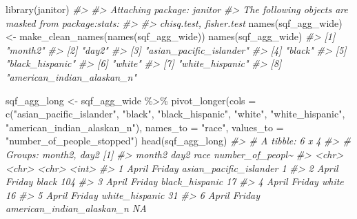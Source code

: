 \documentclass[
]{krantz}
\makeatletter
\newenvironment{Shaded}{\begin{snugshade}}{\end{snugshade}}
\newcommand{\AttributeTok}[1]{\textcolor[rgb]{0.61,0.61,0.61}{#1}}
\newcommand{\CommentTok}[1]{\textcolor[rgb]{0.37,0.37,0.37}{\textit{#1}}}
\newcommand{\FunctionTok}[1]{\textcolor[rgb]{0,0,0}{#1}}
\newcommand{\NormalTok}[1]{#1}
\newcommand{\OtherTok}[1]{\textcolor[rgb]{0.37,0.37,0.37}{#1}}
\newcommand{\SpecialCharTok}[1]{\textcolor[rgb]{0,0,0}{#1}}
\newcommand{\StringTok}[1]{\textcolor[rgb]{0.5,0.5,0.5}{#1}}
\newenvironment{kframe}{%
\medskip{}
\setlength{\fboxsep}{.8em}
 \def\at@end@of@kframe{}%
 \ifinner\ifhmode%
  \def\at@end@of@kframe{\end{minipage}}%
  \begin{minipage}{\columnwidth}%
 \fi\fi%
 \def\FrameCommand##1{\hskip\@totalleftmargin \hskip-\fboxsep
 \colorbox{shadecolor}{##1}\hskip-\fboxsep
     \hskip-\linewidth \hskip-\@totalleftmargin \hskip\columnwidth}%
 \MakeFramed {\advance\hsize-\width
   \@totalleftmargin\z@ \linewidth\hsize
   \@setminipage}}%
 {\par\unskip\endMakeFramed%
 \at@end@of@kframe}
\renewenvironment{Shaded}{\begin{kframe}}{\end{kframe}}
\makeatother
\begin{document}
\begin{Shaded}
\begin{Highlighting}[]
\FunctionTok{library}\NormalTok{(janitor)}
\CommentTok{\#\textgreater{} }
\CommentTok{\#\textgreater{} Attaching package: \textquotesingle{}janitor\textquotesingle{}}
\CommentTok{\#\textgreater{} The following objects are masked from \textquotesingle{}package:stats\textquotesingle{}:}
\CommentTok{\#\textgreater{} }
\CommentTok{\#\textgreater{}     chisq.test, fisher.test}
\FunctionTok{names}\NormalTok{(sqf\_agg\_wide) }\OtherTok{\textless{}{-}} \FunctionTok{make\_clean\_names}\NormalTok{(}\FunctionTok{names}\NormalTok{(sqf\_agg\_wide))}
\FunctionTok{names}\NormalTok{(sqf\_agg\_wide)}
\CommentTok{\#\textgreater{} [1] "month2"                   }
\CommentTok{\#\textgreater{} [2] "day2"                     }
\CommentTok{\#\textgreater{} [3] "asian\_pacific\_islander"   }
\CommentTok{\#\textgreater{} [4] "black"                    }
\CommentTok{\#\textgreater{} [5] "black\_hispanic"           }
\CommentTok{\#\textgreater{} [6] "white"                    }
\CommentTok{\#\textgreater{} [7] "white\_hispanic"           }
\CommentTok{\#\textgreater{} [8] "american\_indian\_alaskan\_n"}
\end{Highlighting}
\end{Shaded}

\begin{Shaded}
\begin{Highlighting}[]
\NormalTok{sqf\_agg\_long }\OtherTok{\textless{}{-}}\NormalTok{ sqf\_agg\_wide }\SpecialCharTok{\%\textgreater{}\%}
  \FunctionTok{pivot\_longer}\NormalTok{(}\AttributeTok{cols =} \FunctionTok{c}\NormalTok{(}\StringTok{"asian\_pacific\_islander"}\NormalTok{, }
                        \StringTok{"black"}\NormalTok{,}
                        \StringTok{"black\_hispanic"}\NormalTok{,}
                        \StringTok{"white"}\NormalTok{,}
                        \StringTok{"white\_hispanic"}\NormalTok{,}
                        \StringTok{"american\_indian\_alaskan\_n"}\NormalTok{),}
               \AttributeTok{names\_to =} \StringTok{"race"}\NormalTok{,}
               \AttributeTok{values\_to =} \StringTok{"number\_of\_people\_stopped"}\NormalTok{)}
\FunctionTok{head}\NormalTok{(sqf\_agg\_long)}
\CommentTok{\#\textgreater{} \# A tibble: 6 x 4}
\CommentTok{\#\textgreater{} \# Groups:   month2, day2 [1]}
\CommentTok{\#\textgreater{}   month2 day2   race                      number\_of\_peopl\textasciitilde{}}
\CommentTok{\#\textgreater{}   \textless{}chr\textgreater{}  \textless{}chr\textgreater{}  \textless{}chr\textgreater{}                                \textless{}int\textgreater{}}
\CommentTok{\#\textgreater{} 1 April  Friday asian\_pacific\_islander                   1}
\CommentTok{\#\textgreater{} 2 April  Friday black                                  104}
\CommentTok{\#\textgreater{} 3 April  Friday black\_hispanic                          17}
\CommentTok{\#\textgreater{} 4 April  Friday white                                   16}
\CommentTok{\#\textgreater{} 5 April  Friday white\_hispanic                          31}
\CommentTok{\#\textgreater{} 6 April  Friday american\_indian\_alaskan\_n               NA}
\end{Highlighting}
\end{Shaded}
\end{document}
